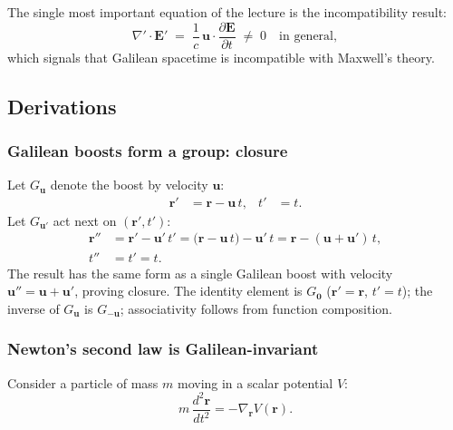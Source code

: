 The single most important equation of the lecture is the
incompatibility result:
\begin{equation}
  \boxed{
    \nabla' \cdot \mathbf{E}' \;=\;
    \frac{1}{c}\,\mathbf{u}\cdot\frac{\partial\mathbf{E}}{\partial t}
    \;\neq\; 0 \quad \text{in general},
  }
  \label{eq:lec01:inconsistency}
\end{equation}
which signals that Galilean spacetime is incompatible with Maxwell's
theory.

\subsection*{Derivations}

\subsubsection*{Galilean boosts form a group: closure}

Let $G_{\mathbf{u}}$ denote the boost by velocity $\mathbf{u}$:
\begin{align}
  \mathbf{r}' &= \mathbf{r} - \mathbf{u}\,t, &
  t'           &= t.
  \label{eq:lec01:boost-closure-start}
\end{align}
Let $G_{\mathbf{u}'}$ act next on $(\mathbf{r}', t')$:
\begin{align}
  \mathbf{r}'' &= \mathbf{r}' - \mathbf{u}'\,t'
               = \bigl(\mathbf{r} - \mathbf{u}\,t\bigr)
                 - \mathbf{u}'\,t
               = \mathbf{r} - (\mathbf{u}+\mathbf{u}')\,t,\\
  t''          &= t' = t.
\end{align}
The result has the same form as a single Galilean boost with velocity
$\mathbf{u}'' = \mathbf{u} + \mathbf{u}'$, proving closure.
The identity element is $G_{\mathbf{0}}$ ($\mathbf{r}' = \mathbf{r}$,
$t' = t$); the inverse of $G_{\mathbf{u}}$ is $G_{-\mathbf{u}}$;
associativity follows from function composition.

\subsubsection*{Newton's second law is Galilean-invariant}

Consider a particle of mass $m$ moving in a scalar potential $V$:
\begin{equation}
  m\,\frac{d^2\mathbf{r}}{dt^2} = -\nabla_{\mathbf{r}} V(\mathbf{r}).
  \label{eq:lec01:newt}
\end{equation}

